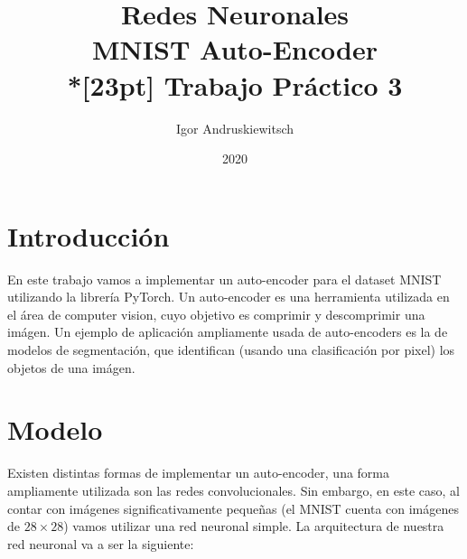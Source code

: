 \documentclass [a4paper,12pt,oneside,final]{article}
\title{%
Redes Neuronales \\
MNIST Auto-Encoder \\*[23pt]
Trabajo Práctico 3 \\
}
\date{2020}
\author{Igor Andruskiewitsch}
\begin{document}
    \maketitle

\section{Introducción}

En este trabajo vamos a implementar un auto-encoder para el dataset MNIST utilizando la librería PyTorch. Un auto-encoder es una herramienta utilizada en el área de computer vision, cuyo objetivo es comprimir y descomprimir una imágen. Un ejemplo de aplicación ampliamente usada de auto-encoders es la de modelos de segmentación, que identifican (usando una clasificación por pixel) los objetos de una imágen.

\section{Modelo}

Existen distintas formas de implementar un auto-encoder, una forma ampliamente utilizada son las redes convolucionales. Sin embargo, en este caso, al contar con imágenes significativamente pequeñas (el MNIST cuenta con imágenes de $28 \times 28$) vamos utilizar una red neuronal simple. La arquitectura de nuestra red neuronal va a ser la siguiente:
\end{document}
